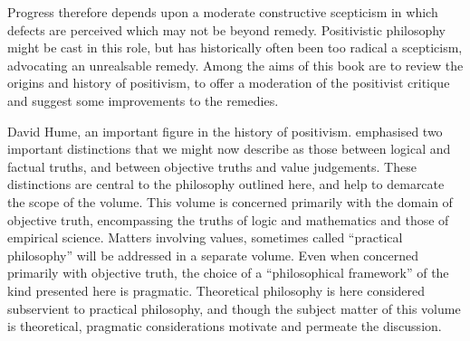 Progress therefore depends upon a moderate constructive scepticism in which defects are perceived which may not be beyond remedy.
Positivistic philosophy might be cast in this role, but has historically often been too radical a scepticism, advocating an unrealsable remedy.
Among the aims of this book are to review the origins and history of positivism, to offer a moderation of the positivist critique and suggest some improvements to the remedies.

David Hume, an important figure in the history of positivism. emphasised two important distinctions that we might now describe as those between logical and factual truths, and between objective truths and value judgements.
These distinctions are central to the philosophy outlined here, and help to demarcate the scope of the volume.
This volume is concerned primarily with the domain of objective truth, encompassing the truths of logic and mathematics and those of empirical science.
Matters involving values, sometimes called ``practical philosophy'' will be addressed in a separate volume.
Even when concerned primarily with objective truth, the choice of a ``philosophical framework'' of the kind presented here is pragmatic.
Theoretical philosophy is here considered subservient to practical philosophy, and though the subject matter of this volume is theoretical, pragmatic considerations motivate and permeate the discussion.

\mainmatter
